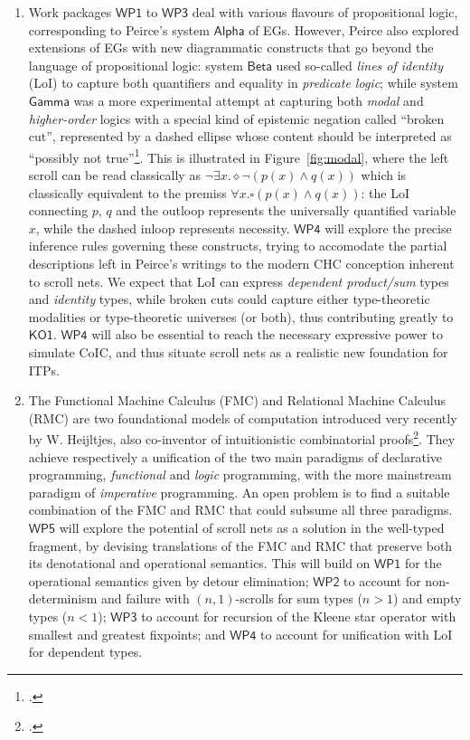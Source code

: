 \documentclass[12pt,draftproposal]{msca-pf}
\newcommand{\KO}[1]{$\mathsf{KO#1}$}
\newcommand{\WP}[1]{$\mathsf{WP#1}$}
\begin{document}
\begin{enumerate}
    \item Work packages \WP{1} to \WP{3} deal with various flavours of propositional logic,
    corresponding to Peirce's system $\mathsf{Alpha}$ of EGs. However, Peirce also explored
    extensions of EGs with new diagrammatic constructs that go beyond the language of propositional
    logic: system $\mathsf{Beta}$ used so-called \emph{lines of identity} (LoI) to capture both
    quantifiers and equality in \emph{predicate logic}; while system $\mathsf{Gamma}$ was a more
    experimental attempt at capturing both \emph{modal} and \emph{higher-order} logics with a
    special kind of epistemic negation called ``broken cut'', represented by a dashed ellipse whose
    content should be interpreted as ``possibly not true''\footcite{maGammaGraphCalculi2018}. This
    is illustrated in Figure~\ref{fig:modal}, where the left scroll can be read classically as $\neg
    \exists x. \diamond \neg (p(x) \land q(x))$ which is classically equivalent to the premiss
    $\forall x. \square (p(x) \land q(x))$: the LoI connecting $p$, $q$ and the outloop represents
    the universally quantified variable $x$, while the dashed inloop represents necessity. \WP{4}
    will explore the precise inference rules governing these constructs, trying to accomodate the
    partial descriptions left in Peirce's writings to the modern CHC conception inherent to scroll
    nets. We expect that LoI can express \emph{dependent product/sum} types and \emph{identity}
    types, while broken cuts could capture either type-theoretic modalities or type-theoretic
    universes (or both), thus contributing greatly to \KO{1}. \WP{4} will also be essential to reach
    the necessary expressive power to simulate CoIC, and thus situate scroll nets as a realistic new
    foundation for ITPs.

    \item The Functional Machine Calculus (FMC) and Relational Machine Calculus (RMC) are two
    foundational models of computation introduced very recently by W. Heijltjes, also co-inventor of
    intuitionistic combinatorial
    proofs\footcite{heijltjesFunctionalMachineCalculus2023,barrettRelationalMachineCalculus2024,heijltjes_intuitionistic_2019}.
    They achieve respectively a unification of the two main paradigms of declarative programming,
    \emph{functional} and \emph{logic} programming, with the more mainstream paradigm of
    \emph{imperative} programming. An open problem is to find a suitable combination of the FMC and
    RMC that could subsume all three paradigms. \WP{5} will explore the potential of scroll nets as
    a solution in the well-typed fragment, by devising translations of the FMC and RMC that preserve
    both its denotational and operational semantics. This will build on \WP{1} for the operational
    semantics given by detour elimination; \WP{2} to account for non-determinism and failure with
    $(n,1)$-scrolls for sum types ($n > 1$) and empty types ($n < 1$); \WP{3} to account for
    recursion of the Kleene star operator with smallest and greatest fixpoints; and \WP{4} to
    account for unification with LoI for dependent types.
\end{enumerate}
\end{document}
